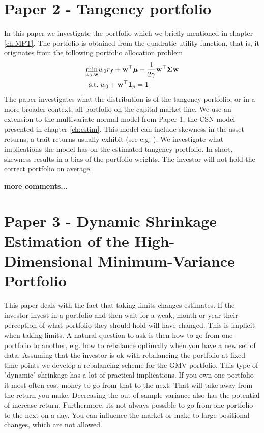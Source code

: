 \documentclass[]{book}\usepackage{knitr}
\begin{document}
\section*{Paper 2 - Tangency portfolio}\label{sec:paper2}
In this paper we investigate the portfolio which we briefly mentioned in chapter \ref{ch:MPT}. 
The portfolio is obtained from the quadratic utility function, that is, it originates from the following portfolio allocation problem
\begin{align}
  \min_{w_0,\mathbf{w}} & w_0 r_f + \mathbf{w}^\top \mbox{\boldmath$\mu$} - \frac{1}{2\gamma} \mathbf{w}^\top \mathbf{\Sigma} \mathbf{w} \\
  \text{ s.t.} &\; w_0 + \mathbf{w}^\top \mathbf{1}_p = 1
\end{align}
The paper investigates what the distribution is of the tangency portfolio, or in a more broader context, all portfolio on the capital market line.
We use an extension to the multivariate normal model from Paper 1, the CSN model presented in chapter \ref{ch:estim}. 
This model can include skewness in the asset returns, a trait returns usually exhibit (see e.g. \citet{cont2001empirical}). 
We investigate what implications the model has on the estimated tangency portfolio.
In short, skewness results in a bias of the portfolio weights. 
The investor will not hold the correct portfolio on average.

\textbf{more comments...}
\section*{Paper 3 - Dynamic Shrinkage Estimation of the High-Dimensional Minimum-Variance Portfolio}\label{sec:paper3}
This paper deals with the fact that taking limits changes estimates. 
If the investor invest in a portfolio and then wait for a weak, month or year their perception of what portfolio they should hold will have changed. 
This is implicit when taking limits.
A natural question to ask is then how to go from one portfolio to another, e.g. how to rebalance optimally when you have a new set of data. 
Assuming that the investor is ok with rebalancing the portfolio at fixed time points we develop a rebalancing scheme for the GMV portfolio.
This type of "dynamic" shrinkage has a lot of practical implications.
If you own one portfolio it most often cost money to go from that to the next.
That will take away from the return you make.
Decreasing the out-of-sample variance also has the potential of increase return.
Furthermore, its not always possible to go from one portfolio to the next on a day.
You can influence the market or make to large positional changes, which are not allowed.
\end{document}
